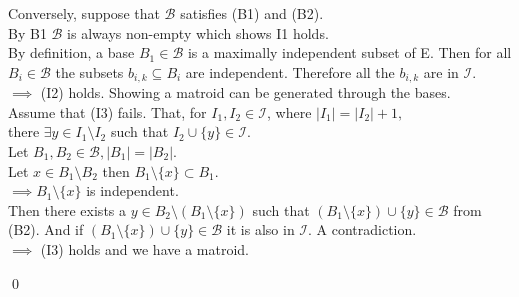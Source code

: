 \documentclass{article}
\theoremstyle{plain}
\theoremstyle{definition}
\theoremstyle{remark}
\begin{document}
\vspace{4mm}

\noindent Conversely, suppose that $\mathcal{B}$ satisfies (B1) and (B2).\\
\noindent By B1 $\mathcal{B}$ is always non-empty which shows I1 holds.
\\
\noindent By definition, a base $B_1 \in \mathcal{B}$ is a maximally independent subset of E. Then for all $B_i \in \mathcal{B}$ the subsets $b_{i,k} \subseteq B_i$  are independent. Therefore all the $b_{i,k}$ are in $\mathcal{I}.$\\ \noindent $\implies$ (I2) holds. Showing a matroid can be generated through the bases.
\\
\noindent Assume that (I3) fails. That, for $I_1, I_2 \in \mathcal{I}$, where $|I_1| = |I_2|+1,$\\ \noindent there $\exists y \in I_1 \setminus I_2$ such that $I_2 \cup \{y\} \in \mathcal{I}.$\\
\noindent Let $B_1, B_2 \in \mathcal{B}, |B_1| = |B_2|.$\\
\noindent Let $x \in B_1 \setminus B_2$ then $B_1 \setminus \{x\} \subset B_1.$ \\ \noindent $\implies B_1 \setminus \{x\}$ is independent.\\
\noindent Then there exists a $y \in B_2 \setminus (B_1 \setminus \{x\})$ such that $(B_1 \setminus \{x\}) \cup \{y\} \in \mathcal{B}$ from (B2). And if $(B_1 \setminus \{x\}) \cup \{y\} \in \mathcal{B}$ it is also in $\mathcal{I}$. A contradiction.\\ \noindent $\implies$ (I3) holds and we have a matroid.

\qed
\end{document}

